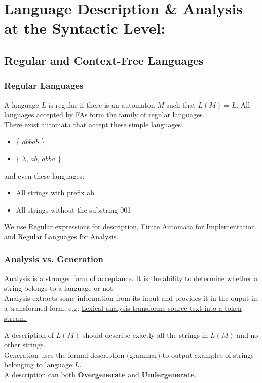 \chapter{Language Description \& Analysis at the Syntactic Level:}

\section{Regular and Context-Free Languages} 

\subsection{Regular Languages}
A language $L$ is regular if there is an automaton $M$ such that $L(M) = L$. All languages accepted by FAs form the family of regular languages.\\ 
There exist automata that accept these simple languages:
\begin{itemize}  \item \{ $abbab$ \}  \item \{ $\lambda$, $ab$, $abba$ \} \end{itemize}
and even these languages:
\begin{itemize}
 \item    All strings with prefix ab
\item    All strings without the substring 001
\end{itemize}

We use Regular expressions for description, Finite Automata for Implementation and Regular Languages for Analysis.\\

\subsection{Analysis vs. Generation}
Analysis is a stronger form of acceptance. It is the ability to determine whether a string belongs to a language or not.\\
Analysis extracts some information from its input and provides it in the ouput in a transformed form, e.g: \underline{Lexical analysis transforms source text into a token stream.} 

A description of $L(M)$ should describe exactly all the strings in $L(M)$ and no other strings.\\
Generation uses the formal description (grammar) to output examples of strings belonging to language $L$.\\
A description can both \textbf{Overgenerate} and \textbf{Undergenerate}.\\

